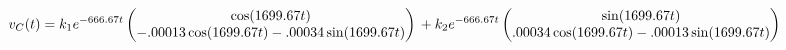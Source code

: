 \documentclass[preview]{standalone}
\begin{document}
\begin{center}
\[
                                                v_C(t) = k_1e^{-666.67t}
                                                \begin{pmatrix} 
                                                \cos(1699.67t) \\ 
                                                -.00013\cos(1699.67t) - .00034\sin(1699.67t)
                                                \end{pmatrix} \\
                                                + k_2e^{-666.67t}
                                                \begin{pmatrix} 
                                                \sin(1699.67t) \\ 
                                                .00034\cos(1699.67t) - .00013\sin(1699.67t)
                                                \end{pmatrix}
                                        \]
\end{center}
\end{document}
